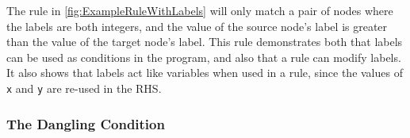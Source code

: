 \documentclass[authoryearcitations]{UoYCSproject}
\begin{document}
The rule in \autoref{fig:ExampleRuleWithLabels} will only match a pair
of nodes where the labels are both integers, and the value of the source node's
label is greater than the value of the target node's label. This rule
demonstrates both that labels can be used as conditions in the program, and also
that a rule can modify labels. It also shows that labels act like variables when
used in a rule, since the values of \texttt{x} and \texttt{y} are re-used in the
RHS.


\subsubsection{The Dangling Condition}
\label{sec:TheDanglingCondition}
\end{document}
